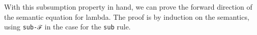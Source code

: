 \begin{fence}
\begin{code}
\\
\>[0]\AgdaSpace{}%
\AgdaSpace{}%
\AgdaSymbol{(}\AgdaSpace{}%
\AgdaSymbol{)}\AgdaSpace{}%
\AgdaSymbol{=}\AgdaSpace{}%
\AgdaSpace{}%
\AgdaSymbol{(}\AgdaSpace{}%
\AgdaSymbol{)}\AgdaSpace{}%
\<%
\\
\>[0]\AgdaSpace{}%
\AgdaSpace{}%
\AgdaSymbol{(}\AgdaSpace{}%
\AgdaSymbol{)}\AgdaSpace{}%
\AgdaSymbol{=}\AgdaSpace{}%
\AgdaSpace{}%
\AgdaSymbol{(}\AgdaSpace{}%
\AgdaSymbol{)}\AgdaSpace{}%
\<%
\\
\>[0]\AgdaSpace{}%
\AgdaSymbol{\{}\AgdaSpace{}%
\AgdaSymbol{=}\AgdaSpace{}%
\AgdaSpace{}%
\AgdaSpace{}%
\AgdaSpace{}%
\AgdaSpace{}%
\AgdaSpace{}%
\AgdaSpace{}%
\AgdaSymbol{\}}\AgdaSpace{}%
\AgdaSymbol{\{}\AgdaSpace{}%
\AgdaSpace{}%
\AgdaSymbol{(}\AgdaSpace{}%
\AgdaSpace{}%
\AgdaSymbol{)\}}\AgdaSpace{}%
\AgdaSpace{}%
\AgdaSpace{}%
\AgdaOperator{\AgdaInductiveConstructor{,}}\AgdaSpace{}%
\AgdaSpace{}%
\AgdaSpace{}%
\AgdaSpace{}%
\AgdaSymbol{=}\<%
\\
\>[0][@{}l@{\AgdaIndent{0}}]%
\>[3]\AgdaSpace{}%
\AgdaSpace{}%
\<%
\\
\>[0]\AgdaSpace{}%
\AgdaSpace{}%
\AgdaSymbol{(}\AgdaSpace{}%
\AgdaSpace{}%
\AgdaSymbol{)}\AgdaSpace{}%
\AgdaSymbol{=}\AgdaSpace{}%
\AgdaSpace{}%
\AgdaSymbol{(}\AgdaSpace{}%
\AgdaSpace{}%
\AgdaSymbol{)}\AgdaSpace{}%
\<%
\end{code}
\end{fence}

With this subsumption property in hand, we can prove the forward
direction of the semantic equation for lambda. The proof is by induction
on the semantics, using \texttt{sub-ℱ} in the case for the \texttt{sub}
rule.

